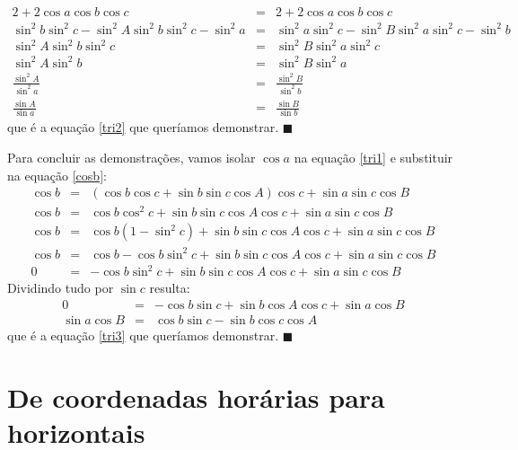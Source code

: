 %
\begin{eqnarray}
2 + 2 \cos a \cos b \cos c &=& 2 + 2 \cos a \cos b \cos c  \\
\sin^2 b \sin^2 c - \sin^2 A \sin^2 b \sin^2 c - \sin^2 a &=& \sin^2 a \sin^2 c - \sin^2 B \sin^2 a \sin^2 c - \sin^2 b \phantom{2em} \\
\sin^2 A \sin^2 b \sin^2 c &=& \sin^2 B \sin^2 a \sin^2 c \\
\sin^2 A \sin^2 b &=& \sin^2 B \sin^2 a \\
\frac{\sin^2 A}{\sin^2 a} &=& \frac{\sin^2 B}{\sin^2 b} \\
\frac{\sin A}{\sin a} &=& \frac{\sin B}{\sin b}
\end{eqnarray}
%
que é a equação \ref{tri2} que queríamos demonstrar. $\blacksquare$

Para concluir as demonstrações, vamos isolar $\cos a$ na equação \ref{tri1} e substituir na equação \ref{cosb}:
%
\begin{eqnarray}
\cos b &=& (\cos b \cos c + \sin b \sin c \cos A) \cos c + \sin a \sin c \cos B \\
\cos b &=& \cos b \cos^2 c + \sin b \sin c \cos A \cos c + \sin a \sin c \cos B \\
\cos b &=& \cos b (1-\sin^2 c) + \sin b \sin c \cos A \cos c + \sin a \sin c \cos B \\
\cos b &=& \cos b - \cos b \sin^2 c + \sin b \sin c \cos A \cos c + \sin a \sin c \cos B \\
0 &=& - \cos b \sin^2 c + \sin b \sin c \cos A \cos c + \sin a \sin c \cos B
\end{eqnarray}
%
Dividindo tudo por $\sin c$ resulta:
\begin{eqnarray}
0 &=& - \cos b \sin c + \sin b \cos A \cos c + \sin a \cos B \\
\sin a \cos B &=& \cos b \sin c - \sin b \cos c \cos A
\end{eqnarray}
que é a equação \ref{tri3} que queríamos demonstrar. $\blacksquare$

\newpage

\section{De coordenadas horárias para horizontais}

